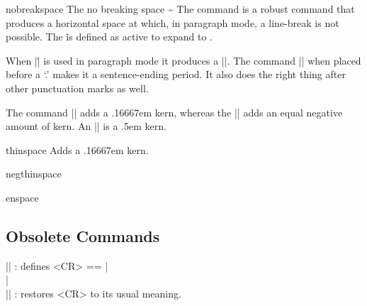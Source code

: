 \begin{docCommand*}{nobreakspace}{}
The no breaking space {\sim} The  command is a robust command that produces a horizontal
space at which, in paragraph mode, a line-break is not possible. The \~ is
defined as active to expand to .
\end{docCommand*}

When |\.| is used in paragraph mode it produces a |\thinspace|. The command
|\@| when placed before a `.' makes it a sentence-ending period. It also
does the right thing after other punctuation marks as well.

The command |\thinspace| adds a .16667em kern, whereas the |\negthinspace| adds
an equal negative amount of kern. An |\enspace| is a .5em kern.
\begin{docCommand*}{thinspace}{}
   Adds a .16667em kern.
\end{docCommand*}

\begin{docCommand}{negthinspace}{}
\end{docCommand}

\begin{docCommand}{enspace}{}

\end{docCommand}






\subsection{Obsolete Commands} 

 |\obeycr|    : defines <CR> == |\\\relax|\\
 |\restorecr| : restores <CR> to its usual meaning.

